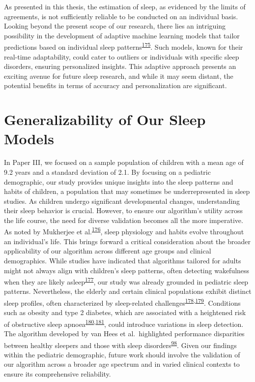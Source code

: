 \documentclass[
  10pt,
]{scrbook}
\begin{document}
As presented in this thesis, the estimation of sleep, as evidenced by
the limits of agreements, is not sufficiently reliable to be conducted
on an individual basis. Looking beyond the present scope of our
research, there lies an intriguing possibility in the development of
adaptive machine learning models that tailor predictions based on
individual sleep
patterns\textsuperscript{\protect\hyperlink{ref-oyebode_2023}{175}}.
Such models, known for their real-time adaptability, could cater to
outliers or individuals with specific sleep disorders, ensuring
personalized insights. This adaptive approach presents an exciting
avenue for future sleep research, and while it may seem distant, the
potential benefits in terms of accuracy and personalization are
significant.

\hypertarget{generalizability-of-our-sleep-models}{%
\section{Generalizability of Our Sleep
Models}\label{generalizability-of-our-sleep-models}}

In Paper III, we focused on a sample population of children with a mean
age of 9.2 years and a standard deviation of 2.1. By focusing on a
pediatric demographic, our study provides unique insights into the sleep
patterns and habits of children, a population that may sometimes be
underrepresented in sleep studies. As children undergo significant
developmental changes, understanding their sleep behavior is crucial.
However, to ensure our algorithm's utility across the life course, the
need for diverse validation becomes all the more imperative. As noted by
Mukherjee et
al.\textsuperscript{\protect\hyperlink{ref-mukherjee_2015}{176}}, sleep
physiology and habits evolve throughout an individual's life. This
brings forward a critical consideration about the broader applicability
of our algorithm across different age groups and clinical demographics.
While studies have indicated that algorithms tailored for adults might
not always align with children's sleep patterns, often detecting
wakefulness when they are likely
asleep\textsuperscript{\protect\hyperlink{ref-quante_2018}{177}}, our
study was already grounded in pediatric sleep patterns. Nevertheless,
the elderly and certain clinical populations exhibit distinct sleep
profiles, often characterized by sleep-related
challenges\textsuperscript{\protect\hyperlink{ref-cassidy_2016}{178},\protect\hyperlink{ref-espiritu_2008}{179}}.
Conditions such as obesity and type 2 diabetes, which are associated
with a heightened risk of obstructive sleep
apnoea\textsuperscript{\protect\hyperlink{ref-altaf_2017}{180},\protect\hyperlink{ref-heinzer_2015}{181}},
could introduce variations in sleep detection. The algorithm developed
by van Hees et al.~highlighted performance disparities between healthy
sleepers and those with sleep
disorders\textsuperscript{\protect\hyperlink{ref-van_hees_estimating_2018}{98}}.
Given our findings within the pediatric demographic, future work should
involve the validation of our algorithm across a broader age spectrum
and in varied clinical contexts to ensure its comprehensive reliability.
\end{document}

